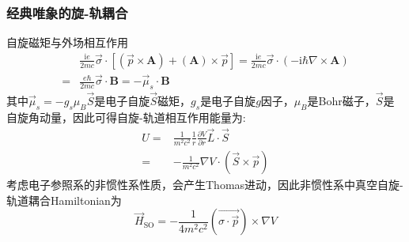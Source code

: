 \frame
{
	\frametitle{经典唯象的旋-轨耦合}
	自旋磁矩与外场相互作用
	\begin{displaymath}
		\begin{aligned}
			&\frac{\mathrm{i}e}{2mc}\vec{\sigma}\cdot[(\vec p\times\mathbf{A})+(\mathbf{A})\times\vec p]=\frac{\mathrm{i}e}{2mc}\vec{\sigma}\cdot(-\mathrm{i}\hbar\nabla\times\mathbf{A})\\
			=&\frac{e\hbar}{2mc}\vec{\sigma}\cdot\mathbf{B}=-\vec{\mu}_s\cdot\mathbf{B}
		\end{aligned}
	\end{displaymath}
	其中$\vec \mu_s=-g_s\mu_B\vec S$是电子自旋$\vec S$磁矩，$g_s$是电子自旋$g$因子，$\mu_B$是\textrm{Bohr}磁子，$\vec S$是自旋角动量，因此可得自旋-轨道相互作用能量为:
	\begin{displaymath}
		\begin{aligned}
			U=&\frac1{m^2c^2}\frac1r\frac{\partial V}{\partial r}\vec L\cdot\vec S\\
			=&-\frac1{m^2c^2}\nabla V\cdot(\vec S\times\vec p)
		\end{aligned}
	\end{displaymath}
	考虑电子参照系的非惯性系性质，会产生\textrm{Thomas}进动，因此非惯性系中真空自旋-轨道耦合\textrm{Hamiltonian}为
	\begin{displaymath}
		\vec H_{\mathrm{SO}}=-\frac1{4m^2c^2}(\vec{\sigma\cdot\vec p})\times\nabla V
	\end{displaymath}
}

